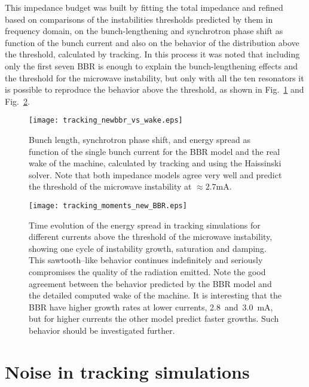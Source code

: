 \begin{apendicesenv}
    This impedance budget was built by fitting the total impedance and refined based on comparisons of the instabilities thresholds predicted by them in frequency domain, on the bunch-lengthening and synchrotron phase shift as function of the bunch current and also on the behavior of the distribution above the threshold, calculated by tracking. In this process it was noted that including only the first seven BBR is enough to explain the bunch-lengthening effects and the threshold for the microwave instability, but only with all the ten resonators it is possible to reproduce the behavior above the threshold, as shown in
    Fig.~\ref{fig:tracking_newbbr_vs_wake} and
    Fig.~\ref{fig:tracking_moments_new_BBR}.
    \begin{figure}[b!]
        \centering
        \texttt{[image: tracking\_newbbr\_vs\_wake.eps]}
        \caption{Bunch length, synchrotron phase shift, and energy spread as function of the single bunch current for the BBR model and the real wake of the machine, calculated by tracking and using the Haissinski solver. Note that both impedance models agree very well and predict the threshold of the microwave instability at $\approx2.7$mA.}
        \label{fig:tracking_newbbr_vs_wake}
    \end{figure}
    \begin{figure}[b!]
        \centering
        \texttt{[image: tracking\_moments\_new\_BBR.eps]}
        \caption{Time evolution of the energy spread in tracking simulations for different currents above the threshold of the microwave instability, showing one cycle of instability growth, saturation and damping. This sawtooth--like behavior continues indefinitely and seriously compromises the quality of the radiation emitted. Note the good agreement between the behavior predicted by the BBR model and the detailed computed wake of the machine. It is interesting that the BBR have higher growth rates at lower currents, 2.8~and~3.0~mA, but for higher currents the other model predict faster growths. Such behavior should be investigated further. }
        \label{fig:tracking_moments_new_BBR}
    \end{figure}

\section{Noise in tracking simulations}\label{sec:noise}


\end{apendicesenv}
